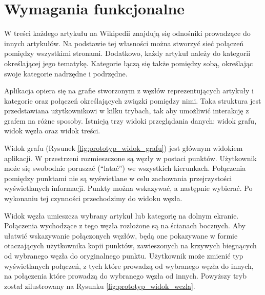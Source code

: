 \section{Wymagania funkcjonalne}
\label{sec:wymagania-funkcjonalne}

W treści każdego artykułu na Wikipedii znajdują się odnośniki prowadzące do innych artykułów. Na podstawie tej własności można stworzyć sieć połączeń pomiędzy wszystkimi stronami. Dodatkowo, każdy artykuł należy do kategorii określającej jego tematykę. Kategorie łączą się także pomiędzy sobą, określając swoje kategorie nadrzędne i podrzędne.

Aplikacja opiera się na grafie stworzonym z węzłów reprezentujących artykuły i kategorie oraz połączeń określających związki pomiędzy nimi. Taka struktura jest przedstawiana użytkownikowi w kilku trybach, tak aby umożliwić interakcję z grafem na różne sposoby. Istnieją trzy widoki przeglądania danych: widok grafu, widok węzła oraz widok treści.

Widok grafu (Rysunek \ref{fig:prototyp_widok_grafu}) jest głównym widokiem aplikacji. W przestrzeni rozmieszczone są węzły w postaci punktów. Użytkownik może się swobodnie poruszać (``latać'') we wszystkich kierunkach. Połączenia pomiędzy punktami nie są wyświetlane w celu zachowania przejrzystości wyświetlanych informacji. Punkty można wskazywać, a następnie wybierać. Po wykonaniu tej czynności przechodzimy do widoku węzła.


Widok węzła umieszcza wybrany artykuł lub kategorię na dolnym ekranie. Połączenia wychodzące z tego węzła rozłożone są na ścianach bocznych. Aby ułatwić wskazywanie połączonych węzłów, będą one pokazywane w formie otaczających użytkownika kopii punktów, zawieszonych na krzywych biegnących od wybranego węzła do oryginalnego punktu. Użytkownik może zmienić typ wyświetlanych połączeń, z tych które prowadzą od wybranego węzła do innych, na połączenia które prowadzą do wybranego węzła od innych. Powyższy tryb został zilustrowany na Rysunku \ref{fig:prototyp_widok_wezla}.

